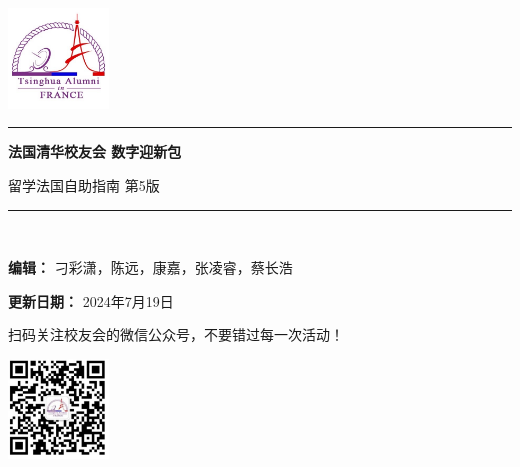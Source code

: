 \documentclass[UTF8]{ctexart}
\newcommand\titleofdoc{\bfseries 法国清华校友会 数字迎新包}
\begin{document}
\begin{titlepage}
   \begin{center}
   
        \vspace{4 cm} 
        
        {\includegraphics[width=0.2\textwidth]{Logo.jpg}}\\

        \vspace{0.5 cm} 
        
        \noindent\rule[0.25\baselineskip]{\textwidth}{1pt}
        
        \vspace{0.5 cm} 
        
        \Huge{\titleofdoc} 

        \vspace{0.5cm}
        
        \LARGE{留学法国自助指南 第5版}
        
        \vspace{1 cm} 
        
        \noindent\rule[0.25\baselineskip]{\textwidth}{1pt}\\
        
        \vspace{1 cm}

        \large{\textbf{编辑：} 刁彩潇，陈远，康嘉，张凌睿，蔡长浩}\\

        \vspace{0.3 cm}

        \large{\textbf{更新日期：} 2024年7月19日}\\

        \vspace{1 cm}

        \large{扫码关注校友会的微信公众号，不要错过每一次活动！}\\

        \vspace{0.5 cm} 
        
        {\includegraphics[width=0.2\textwidth]{QRcode.png}}\\


\end{center}
\end{titlepage}
\end{document}
